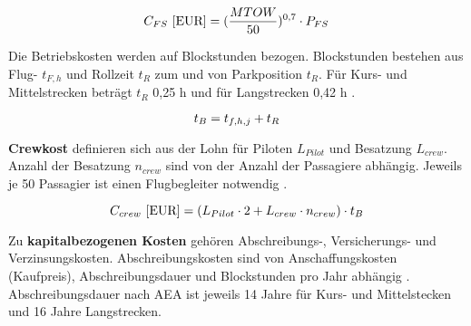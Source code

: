 \begin{equation}
   {C_{FS} ~[\text{EUR}]} = (\frac{MTOW}{50})^{0,7} \cdot P_{FS} \\
   \label{Flugsicherung}
\end{equation}

Die Betriebskosten werden auf Blockstunden bezogen. Blockstunden bestehen aus Flug- $t_{F,h}$ und Rollzeit $t_{R}$ 
zum und von Parkposition $t_{R}$. 
Für Kurs- und Mittelstrecken beträgt $t_{R}$ {0,25 h} und für Langstrecken 0,42 h \cite{scholz_design_evaluation_doc}.

\begin{equation}
   t_{B} = t_{f,h,j} + t_{R} \\
   \label{blockzeit}
\end{equation}

\textbf{Crewkost} definieren sich aus der Lohn für Piloten $L_{Pilot}$ und Besatzung $L_{crew}$. Anzahl der Besatzung $n_{crew}$ sind 
von der Anzahl der Passagiere abhängig. Jeweils je 50 Passagier ist einen Flugbegleiter notwendig \cite{conrady2019luftverkehr}.

\begin{equation}
   {C_{crew} ~[\text{EUR}]} = ({L}_{Pilot} \cdot 2 + {L}_{crew} \cdot n_{crew} ) \cdot t_{B} \\
   \label{crew cost}
\end{equation}





 

Zu \textbf{kapitalbezogenen Kosten} gehören Abschreibungs-, Versicherungs- und Verzinsungskosten. 
Abschreibungskosten sind von Anschaffungskosten (Kaufpreis), Abschreibungsdauer und Blockstunden pro Jahr abhängig \cite{conrady2019luftverkehr}.
Abschreibungsdauer nach AEA ist jeweils 14 Jahre für Kurs- und Mittelstecken und 16 Jahre Langstrecken.

